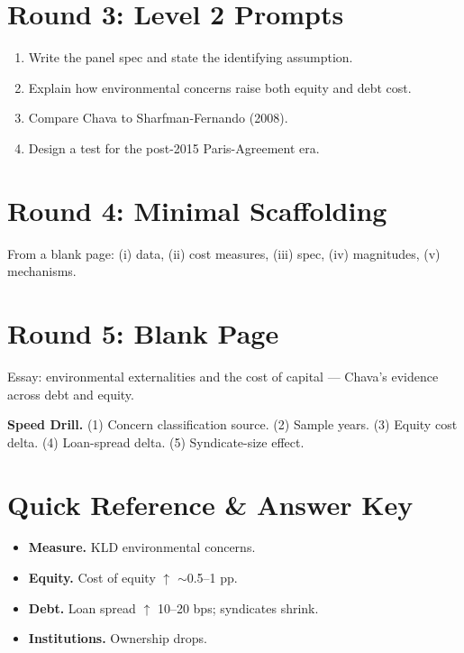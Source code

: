 \documentclass[11pt]{article}
\begin{document}
\section*{Round 3: Level 2 Prompts}
\begin{enumerate}
\item Write the panel spec and state the identifying assumption.
\item Explain how environmental concerns raise both equity and debt cost.
\item Compare Chava to Sharfman-Fernando (2008).
\item Design a test for the post-2015 Paris-Agreement era.
\end{enumerate}

\section*{Round 4: Minimal Scaffolding}
From a blank page: (i) data, (ii) cost measures, (iii) spec, (iv) magnitudes, (v) mechanisms.

\section*{Round 5: Blank Page}
Essay: environmental externalities and the cost of capital --- Chava's evidence across debt and equity.

\vspace{6pt}
\begin{drillbox}
\textbf{Speed Drill.} (1) Concern classification source. (2) Sample years. (3) Equity cost delta. (4) Loan-spread delta. (5) Syndicate-size effect.
\end{drillbox}

\section*{Quick Reference \& Answer Key}
\begin{answerbox}
\begin{itemize}
\item \textbf{Measure.} KLD environmental concerns.
\item \textbf{Equity.} Cost of equity $\uparrow$ $\sim$0.5--1 pp.
\item \textbf{Debt.} Loan spread $\uparrow$ 10--20 bps; syndicates shrink.
\item \textbf{Institutions.} Ownership drops.
\end{itemize}
\end{answerbox}
\end{document}
